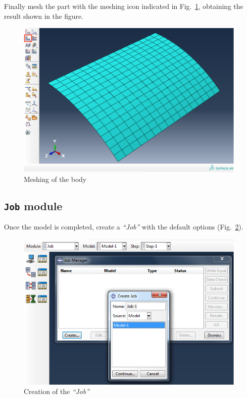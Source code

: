 \documentclass[english,a4paper,12pt]{article}
\begin{document}
Finally mesh the part with the meshing icon indicated in Fig.~\ref{fig:mesh}, obtaining the result shown in the figure.
\begin{figure}[h!tp]
\centering
\includegraphics[scale=0.30]{capturas/36-mesh-x.png}
\caption{Meshing of the body}
\label{fig:mesh}
\end{figure}


\subsection{\texttt{Job} module}

Once the model is completed, create a \emph{``Job''} with the default options (Fig.~\ref{fig:job-create}).
\begin{figure}[h!tp]
\centering
\includegraphics[scale=0.5]{capturas/37-job.png}
\caption{Creation of the \emph{``Job''}}
\label{fig:job-create}
\end{figure}
\end{document}
